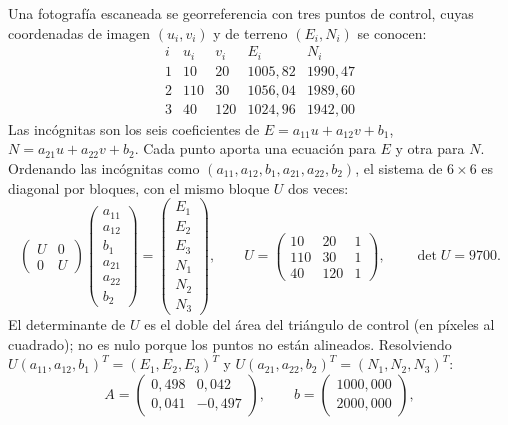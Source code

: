 \begin{ejemplo}\label{ej:06-tres-puntos}
Una fotografía escaneada se georreferencia con tres puntos de control, cuyas coordenadas de
imagen \((u_i,v_i)\) y de terreno \((E_i,N_i)\) se conocen:
\[
\begin{array}{c|cc|cc}
i & u_i & v_i & E_i & N_i\\ \hline
1 & 10 & 20 & 1005{,}82 & 1990{,}47\\
2 & 110 & 30 & 1056{,}04 & 1989{,}60\\
3 & 40 & 120 & 1024{,}96 & 1942{,}00
\end{array}
\]
Las incógnitas son los seis coeficientes de
\(E=a_{11}u+a_{12}v+b_1\), \(N=a_{21}u+a_{22}v+b_2\). Cada punto aporta una ecuación para \(E\)
y otra para \(N\). Ordenando las incógnitas como \((a_{11},a_{12},b_1,a_{21},a_{22},b_2)\), el
sistema de \(6\times6\) es diagonal por bloques, con el mismo bloque \(U\) dos veces:
\[
  \begin{pmatrix}U&0\\0&U\end{pmatrix}
  \begin{pmatrix}a_{11}\\a_{12}\\b_1\\a_{21}\\a_{22}\\b_2\end{pmatrix}
  =\begin{pmatrix}E_1\\E_2\\E_3\\N_1\\N_2\\N_3\end{pmatrix},
  \qquad
  U=\begin{pmatrix}10&20&1\\110&30&1\\40&120&1\end{pmatrix},
  \qquad \det U=9700 .
\]
El determinante de \(U\) es el doble del área del triángulo de control (en píxeles al
cuadrado); no es nulo porque los puntos no están alineados. Resolviendo
\(U(a_{11},a_{12},b_1)^T=(E_1,E_2,E_3)^T\) y \(U(a_{21},a_{22},b_2)^T=(N_1,N_2,N_3)^T\):
\[
  A=\begin{pmatrix}0{,}498&0{,}042\\0{,}041&-0{,}497\end{pmatrix},
  \qquad
  b=\begin{pmatrix}1000{,}000\\2000{,}000\end{pmatrix},
\]
\end{ejemplo}
